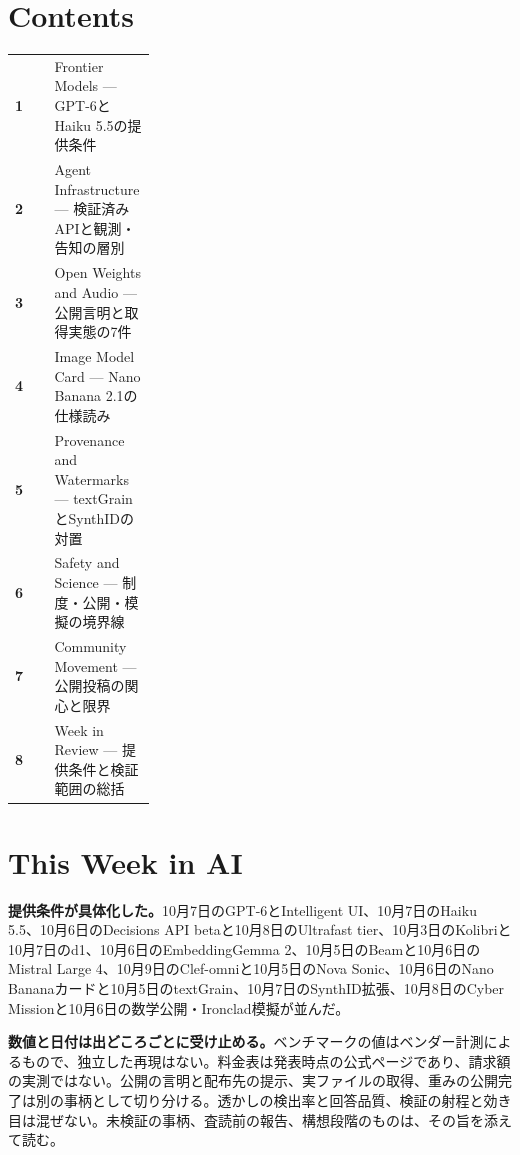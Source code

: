 \section*{Contents}
\begin{tabularx}{0.98\linewidth}{@{}>{\bfseries}p{0.28\linewidth}X@{}}
  1 & Frontier Models --- GPT-6とHaiku 5.5の提供条件 \\
  2 & Agent Infrastructure --- 検証済みAPIと観測・告知の層別 \\
  3 & Open Weights and Audio --- 公開言明と取得実態の7件 \\
  4 & Image Model Card --- Nano Banana 2.1の仕様読み \\
  5 & Provenance and Watermarks --- textGrainとSynthIDの対置 \\
  6 & Safety and Science --- 制度・公開・模擬の境界線 \\
  7 & Community Movement --- 公開投稿の関心と限界 \\
  8 & Week in Review --- 提供条件と検証範囲の総括 \\
\end{tabularx}

\vspace{4mm}
\section*{This Week in AI}

\begin{tcolorbox}[enhanced,colback=SurveySoft,colframe=SurveyRule,boxrule=0.4pt,arc=1mm,left=3mm,right=3mm,top=2mm,bottom=2mm]
\textbf{提供条件が具体化した。}\quad 10月7日のGPT-6とIntelligent UI、10月7日のHaiku 5.5、10月6日のDecisions API betaと10月8日のUltrafast tier、10月3日のKolibriと10月7日のd1、10月6日のEmbeddingGemma 2、10月5日のBeamと10月6日のMistral Large 4、10月9日のClef-omniと10月5日のNova Sonic、10月6日のNano Bananaカードと10月5日のtextGrain、10月7日のSynthID拡張、10月8日のCyber Missionと10月6日の数学公開・Ironclad模擬が並んだ。
\end{tcolorbox}

\begin{tcolorbox}[enhanced,colback=SurveySoft,colframe=SurveyRule,boxrule=0.4pt,arc=1mm,left=3mm,right=3mm,top=2mm,bottom=2mm]
\textbf{数値と日付は出どころごとに受け止める。}\quad ベンチマークの値はベンダー計測によるもので、独立した再現はない。料金表は発表時点の公式ページであり、請求額の実測ではない。公開の言明と配布先の提示、実ファイルの取得、重みの公開完了は別の事柄として切り分ける。透かしの検出率と回答品質、検証の射程と効き目は混ぜない。未検証の事柄、査読前の報告、構想段階のものは、その旨を添えて読む。
\end{tcolorbox}


